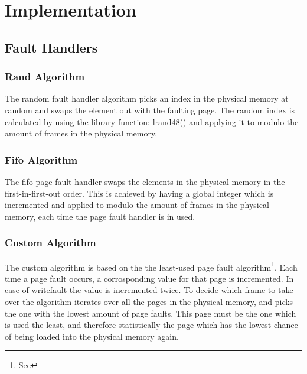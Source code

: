 \section{Implementation}
\subsection{Fault Handlers}
\subsubsection{Rand Algorithm}
The random fault handler algorithm  picks an index in the physical memory at random and swaps the element out with the faulting page. The random index is calculated by using the library function: lrand48() and applying it to modulo the amount of frames in the physical memory.
\subsubsection{Fifo Algorithm}
The fifo page fault handler swaps the elements in the physical memory in the first-in-first-out order. This is achieved by having a global integer which is incremented and applied to modulo the amount of frames in the physical memory, each time the page fault handler is in used.

\subsubsection{Custom Algorithm}
The custom algorithm is based on the the least-used page fault algorithm\footnote{See }. Each time a page fault occurs, a corrosponding value for that page is incremented. In case of writefault the value is incremented twice.
To decide which frame to take over the algorithm iterates over all the pages in the physical memory, and picks the one with the lowest amount of page faults. This page must be the one which is used the least, and therefore statistically the page which has the lowest chance of being loaded into the physical memory again.